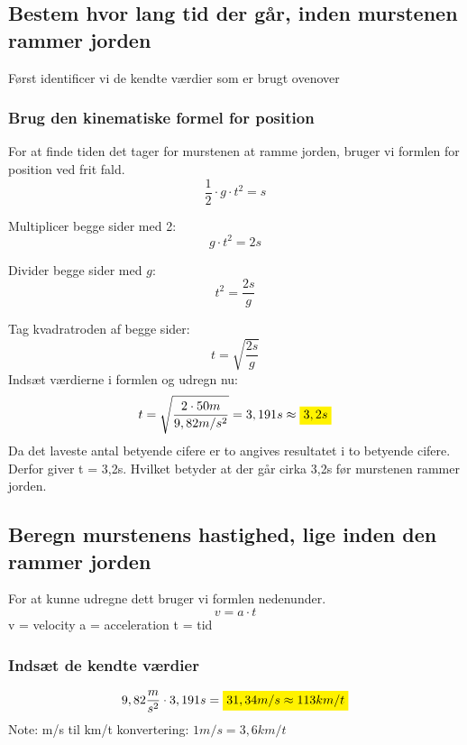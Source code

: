 \subsection{Bestem hvor lang tid der går, inden murstenen rammer jorden}

Først identificer vi de kendte værdier som er brugt ovenover

\subsubsection{Brug den kinematiske formel for position}
For at finde tiden det tager for murstenen at ramme jorden, bruger vi formlen for position ved frit fald.
\begin{equation*}
    \frac{1}{2}\cdot g\cdot t^{2}=s
\end{equation*}

Multiplicer begge sider med 2:
\[ g \cdot t^2 = 2s \]

Divider begge sider med \( g \):
\[ t^2 = \frac{2s}{g} \]

Tag kvadratroden af begge sider:
\[ t = \sqrt{\frac{2s}{g}} \]
Indsæt værdierne i formlen og udregn nu: 
\begin{equation*}
    t = \sqrt{\frac{2 \cdot 50m}{9,82m/s^2}} = 3,191 s \approx \mathcolorbox{yellow}{3,2s}
\end{equation*}
Da det laveste antal betyende cifere er to angives resultatet i to betyende cifere. Derfor giver t = 3,2s. Hvilket betyder at der går cirka 3,2s før murstenen rammer jorden.

\subsection{Beregn murstenens hastighed, lige inden den rammer jorden}
For at kunne udregne dett bruger vi formlen nedenunder.
\begin{equation*}
    v=a\cdot t
\end{equation*}
v = velocity\newline
a = acceleration\newline
t = tid
\subsubsection{Indsæt de kendte værdier}
\begin{equation*}
    9,82 \frac{m}{s^{2}}\cdot 3,191s = \mathcolorbox{yellow}{31,34 m/s \approx 113 km/t}
\end{equation*}
Note: m/s til km/t konvertering: \(1 m/s = 3,6 km/t\)


\newpage